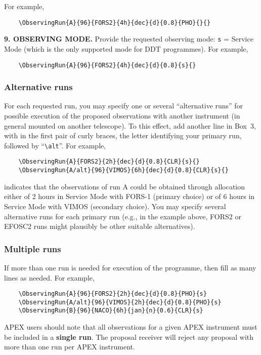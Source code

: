 \documentclass{article}
\begin{document}
\smallskip

For example, 
\begin{verbatim}
    \ObservingRun{A}{96}{FORS2}{4h}{dec}{d}{0.8}{PHO}{}{} 
\end{verbatim}

\medskip

{\bf 9.  OBSERVING MODE.} Provide the requested observing mode:
\verb|s| = Service Mode (which is the only supported mode for DDT 
programmes). For example,
\begin{verbatim}
    \ObservingRun{A}{96}{FORS2}{4h}{dec}{d}{0.8}{s}{}
\end{verbatim}

\subsubsection*{Alternative runs}
For each requested run, you may specify one or several
``alternative runs'' for possible execution of the proposed
observations with another instrument (in general mounted on another
telescope). To this effect, add another line in Box~3, with in the
first pair of curly braces, the letter identifying your primary run,
followed by ``\verb|\alt|''. For example,
\begin{verbatim}
    \ObservingRun{A}{FORS2}{2h}{dec}{d}{0.8}{CLR}{s}{}
    \ObservingRun{A/alt}{96}{VIMOS}{6h}{dec}{d}{0.8}{CLR}{s}{}
\end{verbatim}
indicates that the observations of run A could be obtained
through allocation either of 2 hours in Service Mode with FORS-1
(primary choice) or of 6 hours in Service Mode with VIMOS (secondary
choice). You may specify several alternative runs for each primary run
(e.g., in the example above, FORS2 or EFOSC2 runs might plausibly be
other suitable alternatives).

\subsubsection*{Multiple runs}
If more than one run is needed for execution of
the programme, then fill as many lines as needed.  For example,
\begin{verbatim} 
    \ObservingRun{A}{96}{FORS2}{2h}{dec}{d}{0.8}{PHO}{s} 
    \ObservingRun{A/alt}{96}{VIMOS}{2h}{dec}{d}{0.8}{PHO}{s} 
    \ObservingRun{B}{96}{NACO}{6h}{jan}{n}{0.6}{CLR}{s}
\end{verbatim}

APEX users should note that all observations for a given APEX
instrument must be included in a {\bf single run}. The proposal
receiver 
will reject any proposal with more than one run per APEX instrument. 
\end{document}
